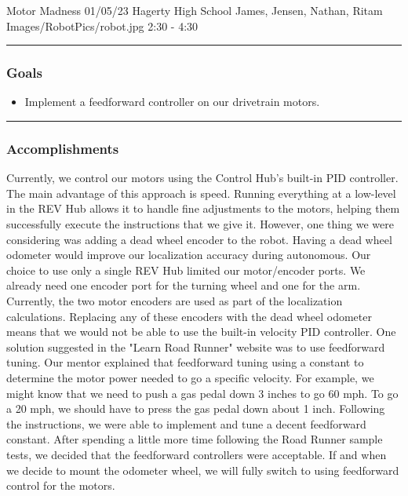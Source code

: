 \insertmeeting 
	{Motor Madness} 
	{01/05/23} 
	{Hagerty High School}
	{James, Jensen, Nathan, Ritam}
	{Images/RobotPics/robot.jpg}
	{2:30 - 4:30}

\noindent\hfil\rule{\textwidth}{.4pt}\hfil
\subsubsection*{Goals}
\begin{itemize}
    \item Implement a feedforward controller on our drivetrain motors. 

\end{itemize} 

\noindent\hfil\rule{\textwidth}{.4pt}\hfil

\subsubsection*{Accomplishments}
Currently, we control our motors using the Control Hub's built-in PID controller. The main advantage of this approach is speed. Running everything at a low-level in the REV Hub allows it to handle fine adjustments to the motors, helping them successfully execute the instructions that we give it. However, one thing we were considering was adding a dead wheel encoder to the robot. Having a dead wheel odometer would improve our localization accuracy during autonomous. Our choice to use only a single REV Hub limited our motor/encoder ports. We already need one encoder port for the turning wheel and one for the arm. Currently, the two motor encoders are used as part of the localization calculations. Replacing any of these encoders with the dead wheel odometer means that we would not be able to use the built-in velocity PID controller. One solution suggested in the "Learn Road Runner" website was to use feedforward tuning. Our mentor explained that feedforward tuning using a constant to determine the motor power needed to go a specific velocity. For example, we might know that we need to push a gas pedal down 3 inches to go 60 mph. To go a 20 mph, we should have to press the gas pedal down about 1 inch. Following the instructions, we were able to implement and tune a decent feedforward constant. After spending a little more time following the Road Runner sample tests, we decided that the feedforward controllers were acceptable. If and when we decide to mount the odometer wheel, we will fully switch to using feedforward control for the motors. 




